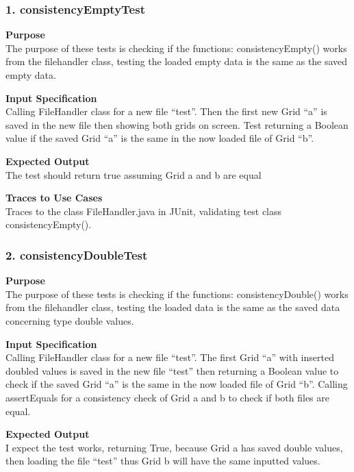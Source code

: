 \documentclass[12pt]{article}
\begin{document}
\subsubsection{1. consistencyEmptyTest} \label{tc:1}

\noindent
{\bf Purpose}\\
The purpose of these tests is checking if the functions: consistencyEmpty() works from the filehandler class, testing the loaded empty data is the same as the saved empty data.

\noindent
{\bf Input Specification}\\
Calling FileHandler class for a new file “test”.  Then the first new Grid “a” is saved in the new file then showing both grids on screen. Test returning a Boolean value if the saved Grid “a” is the same in the now loaded file of Grid “b”.

\noindent
{\bf Expected Output}\\
The test should return true assuming Grid a and b are equal

\noindent
{\bf Traces to Use Cases}\\
Traces to the class FileHandler.java in JUnit, validating test class consistencyEmpty().
\subsubsection{2. consistencyDoubleTest} \label{tc:1}

\noindent
{\bf Purpose}\\
The purpose of these tests is checking if the functions: consistencyDouble() works from the filehandler class, testing the loaded data is the same as the saved data concerning type double values.

\noindent
{\bf Input Specification}\\
Calling FileHandler class for a new file “test”.  The first Grid “a” with inserted doubled values is saved in the new file “test” then returning a Boolean value to check if the saved Grid “a” is the same in the now loaded file of Grid “b”.  Calling assertEquals for a consistency check of Grid a and b to check if both files are equal.

\noindent
{\bf Expected Output}\\
I expect the test works, returning True, because Grid a has saved double values, then loading the file “test” thus Grid b will have the same inputted values.
\end{document}
